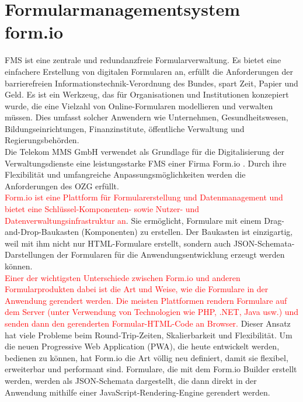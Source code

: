 \section{Formularmanagementsystem form.io}

FMS ist eine zentrale und redundanzfreie Formularverwaltung. Es bietet eine einfachere Erstellung von digitalen Formularen an, erfüllt die Anforderungen der barrierefreien Informationstechnik-Verordnung des Bundes, spart Zeit, Papier und Geld. Es ist ein Werkzeug, das für Organisationen und Institutionen konzepiert wurde, die eine Vielzahl von Online-Formularen modellieren und verwalten müssen. Dies umfasst solcher Anwendern wie Unternehmen, Gesundheitswesen, Bildungseinrichtungen, Finanzinstitute, öffentliche Verwaltung und Regierungsbehörden. \\

Die Telekom MMS GmbH verwendet als Grundlage für die Digitalisierung der Verwaltungsdienste eine leistungsstarke FMS einer Firma Form.io \citep{formio}. Durch ihre Flexibilität und umfangreiche Anpassungsmöglichkeiten werden die Anforderungen des OZG erfüllt.\\


\textcolor{red}{Form.io ist eine Plattform für Formularerstellung und Datenmanagement und bietet eine Schlüssel-Komponenten- sowie Nutzer- und Datenverwaltungsinfrastruktur an}. Sie ermöglicht, Formulare mit einem Drag-and-Drop-Baukasten (Komponenten) zu erstellen. Der Baukasten ist einzigartig, weil mit ihm nicht nur HTML-Formulare erstellt, sondern auch JSON-Schemata-Darstellungen der Formularen für die Anwendungsentwicklung erzeugt werden können.\\

\textcolor{red}{Einer der wichtigsten Unterschiede zwischen Form.io und anderen Formularprodukten dabei ist die Art und Weise, wie die Formulare in der Anwendung gerendert werden. Die meisten Plattformen rendern Formulare auf  dem Server (unter Verwendung von Technologien wie PHP, .NET, Java usw.) und senden dann den gerenderten Formular-HTML-Code an Browser.} Dieser Ansatz hat viele Probleme beim Round-Trip-Zeiten, Skalierbarkeit und Flexibilität. Um die neuen Progressive Web Application (PWA), die heute entwickelt werden, bedienen zu können, hat Form.io die Art völlig neu definiert, damit sie flexibel, erweiterbar und performant sind. Formulare, die mit dem Form.io Builder erstellt werden, werden als JSON-Schemata dargestellt, die dann direkt in der Anwendung mithilfe einer JavaScript-Rendering-Engine gerendert werden.\\


